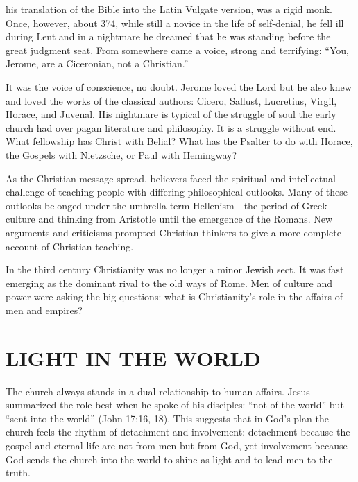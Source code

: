 
 his translation of the Bible into the Latin Vulgate version, was a
rigid monk. Once, however, about 374, while still a novice in the life of self-denial, he fell ill
during Lent and in a nightmare he dreamed that he was standing before the great judgment seat. From
somewhere came a voice, strong and terrifying: “You, Jerome, are a Ciceronian, not a Christian.”

It was the voice of conscience, no doubt. Jerome loved the Lord but he also knew and loved the works
of the classical authors: Cicero, Sallust, Lucretius, Virgil, Horace, and Juvenal. His nightmare is
typical of the struggle of soul the early church had over pagan literature and philosophy. It is a
struggle without end. What fellowship has Christ with Belial? What has the Psalter to do with
Horace, the Gospels with Nietzsche, or Paul with Hemingway?

As the Christian message spread, believers faced the spiritual and intellectual challenge of
teaching people with differing philosophical outlooks. Many of these outlooks belonged under the
umbrella term Hellenism—the period of Greek culture and thinking from Aristotle until the emergence
of the Romans. New arguments and criticisms prompted Christian thinkers to give a more complete
account of Christian teaching.

In the third century Christianity was no longer a minor Jewish sect. It was fast emerging as the
dominant rival to the old ways of Rome. Men of culture and power were asking the big questions: what
is Christianity’s role in the affairs of men and empires?

\section{LIGHT IN THE WORLD}

The church always stands in a dual relationship to human affairs. Jesus summarized the role best
when he spoke of his disciples: “not of the world” but “sent into the world” (John 17:16, 18). This
suggests that in God’s plan the church feels the rhythm of detachment and involvement: detachment
because the gospel and eternal life are not from men but from God, yet involvement because God sends
the church into the world to shine as light and to lead men to the truth.

